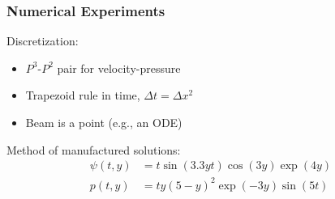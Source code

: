 \documentclass[8pt]{beamer}
\begin{document}
\begin{frame}
    \frametitle{Numerical Experiments}
    Discretization:
    \begin{itemize}
        \item \(P^3\)-\(P^2\) pair for velocity-pressure
        \item Trapezoid rule in time, \(\Delta t = \Delta x^2\)
        \item Beam is a point (e.g., an ODE)
    \end{itemize}
    \pause
    Method of manufactured solutions:
    \begin{align}
        \psi(t, y) &= t \sin(3.3 y t) \cos(3 y) \exp(4 y)                     \\
           p(t, y) &= t y (5 - y)^2 \exp(-3 y) \sin(5 t)
    \end{align}
\end{frame}
\end{document}
